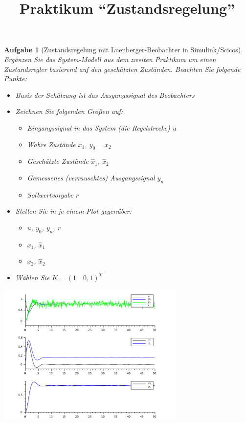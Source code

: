 \documentclass[11pt,a4paper,headsepline]{scrartcl}
\title{Praktikum ``Zustandsregelung''}
\date{}
\newtheorem{aufgabe}{Aufgabe}
\begin{document}
\maketitle
\thispagestyle{fancy}
\vspace{-2cm}

\begin{aufgabe}[Zustandsregelung mit Luenberger-Beobachter in Simulink/Scicos]
\label{Task:Luenberger}
Erg\"anzen Sie das System-Modell aus dem zweiten Praktikum um einen Zustandsregler basierend auf den gesch\"atzten Zust\"anden. Beachten Sie folgende Punkte:
\begin{itemize}
	\item Basis der Sch\"atzung ist das Ausgangssignal des Beobachters
	\item Zeichnen Sie folgenden Gr\"o{\ss}en auf:
	\begin{itemize}
		\item Eingangssignal in das System (die Regelstrecke) $u$
		\item Wahre Zust\"ande $x_{1}$, $y_{0} = x_{2}$
		\item Gesch\"atzte Zust\"ande $\hat{x}_{1}$, $\hat{x}_{2}$
		\item Gemessenes (verrauschtes) Ausgangssignal $y_{n}$
		\item Sollwertvorgabe $r$
	\end{itemize}
	\item Stellen Sie in je einem Plot gegen\"uber:
	\begin{itemize}
		\item $u$, $y_{0}$, $y_{n}$, $r$
		\item $x_{1}$, $\hat{x}_{1}$
		\item $x_{2}$, $\hat{x}_{2}$
		\end{itemize}
	\item W\"ahlen Sie $K = \left(1 \quad 0{,}1\right)^T$
\end{itemize}
\begin{center}
\includegraphics[width = 0.7\textwidth]{P31Output}
\end{center}
\end{aufgabe}
\end{document}
